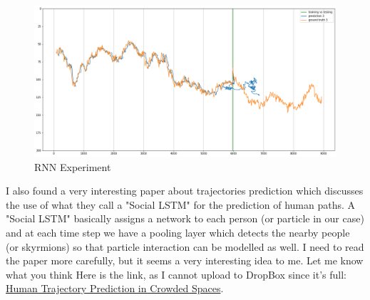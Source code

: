 \documentclass[a4paper]{article}
\begin{document}
\begin{figure}[h]
  \centering
  \includegraphics[width=\textwidth]{rnn}
  \caption{RNN Experiment}
  \label{fig:rnn}
\end{figure}

I also found a very interesting paper about trajectories prediction which discusses the use of what they call a "Social LSTM" for the prediction of human paths. A "Social LSTM" basically assigns a network to each person (or particle in our case) and at each time step we have a pooling layer which detects the nearby people (or skyrmions) so that particle interaction can be modelled as well. I need to read the paper more carefully, but it seems a very interesting idea to me. Let me know what you think Here is the link, as I cannot upload to DropBox since it's full: \href{https://cvgl.stanford.edu/papers/CVPR16_Social_LSTM.pdf}{Human Trajectory Prediction in Crowded Spaces}.

  
\end{document}
